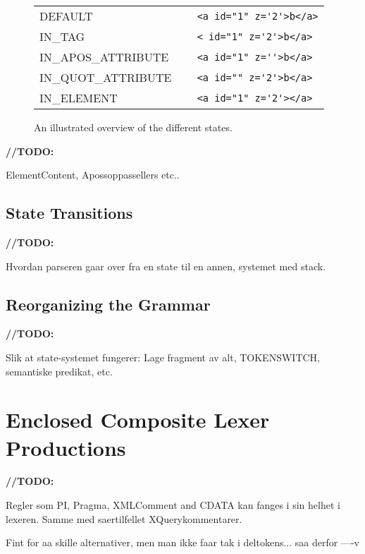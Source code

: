 \begin{figure}[h]
\centering
\begin{tabular}{ll}
DEFAULT				& \framebox[1.0\width]{$\times$}\verb!<a id="1" z='2'>b</a>!\framebox[1.0\width]{$\times$} \\
IN\_TAG				& \verb!<!\framebox[1.0\width]{\texttt{a}}\verb! id="1" z='2'>b</a>! \\
IN\_APOS\_ATTRIBUTE\verb!   !	& \verb!<a id="1" z='!\framebox[1.0\width]{\texttt{2}}\verb!'>b</a>! \\
IN\_QUOT\_ATTRIBUTE		& \verb!<a id="!\framebox[1.0\width]{\texttt{1}}\verb!" z='2'>b</a>! \\
IN\_ELEMENT			& \verb!<a id="1" z='2'>!\framebox[1.0\width]{\texttt{b}}\verb!</a>! \\
\end{tabular}
\caption{An illustrated overview of the different states.}
\label{fig:states}
\end{figure}


\textbf{\LARGE //TODO:} 

ElementContent, Apossoppassellers etc..



\subsection{State Transitions}


\textbf{\LARGE //TODO:} 

Hvordan parseren gaar over fra en state til en annen, systemet med stack.

\subsection{Reorganizing the Grammar}
\label{sect:rewriteGrammar:reorganizing}
\textbf{\LARGE //TODO:} 

Slik at state-systemet fungerer: Lage fragment av alt, TOKENSWITCH, semantiske predikat, etc.


\section{Enclosed Composite Lexer Productions}
\label{sect:rewriteGrammar:enclosedComposite}
\textbf{\LARGE //TODO:} 

Regler som PI, Pragma, XMLComment and CDATA kan fanges i sin helhet i lexeren. Samme med saertilfellet XQuerykommentarer. 

Fint for aa skille alternativer, men man ikke faar tak i deltokens... saa derfor ----v

